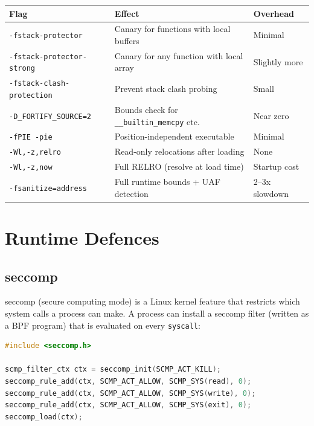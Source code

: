 \begin{longtable}{p{4cm}p{4cm}p{4cm}}
	\toprule
	\textbf{Flag}                     & \textbf{Effect}                                    & \textbf{Overhead} \\
	\midrule
	\texttt{-fstack-protector}        & Canary for functions with local buffers            & Minimal           \\
	\texttt{-fstack-protector-strong} & Canary for any function with local array           & Slightly more     \\
	\texttt{-fstack-clash-protection} & Prevent stack clash probing                        & Small             \\
	\texttt{-D\_FORTIFY\_SOURCE=2}    & Bounds check for \texttt{\_\_builtin\_memcpy} etc. & Near zero         \\
	\texttt{-fPIE -pie}               & Position-independent executable                    & Minimal           \\
	\texttt{-Wl,-z,relro}             & Read-only relocations after loading                & None              \\
	\texttt{-Wl,-z,now}               & Full RELRO (resolve at load time)                  & Startup cost      \\
	\texttt{-fsanitize=address}       & Full runtime bounds + UAF detection                & 2--3x slowdown    \\
	\bottomrule
\end{longtable}

\section{Runtime Defences}

\subsection{seccomp}

seccomp (secure computing mode) is a Linux kernel feature that restricts which system calls a process can make. A process can install a seccomp filter (written as a BPF program) that is evaluated on every \texttt{syscall}:

\begin{lstlisting}[language=C, caption=Minimal seccomp filter]
#include <seccomp.h>

scmp_filter_ctx ctx = seccomp_init(SCMP_ACT_KILL);
seccomp_rule_add(ctx, SCMP_ACT_ALLOW, SCMP_SYS(read), 0);
seccomp_rule_add(ctx, SCMP_ACT_ALLOW, SCMP_SYS(write), 0);
seccomp_rule_add(ctx, SCMP_ACT_ALLOW, SCMP_SYS(exit), 0);
seccomp_load(ctx);
\end{lstlisting}

